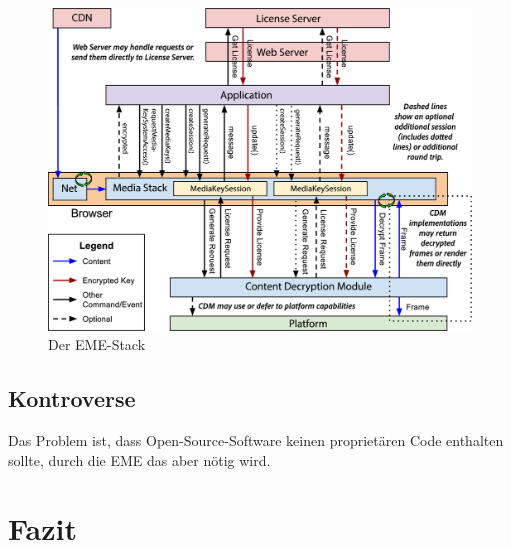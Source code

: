 \documentclass[a4paper,11pt]{scrartcl}
\begin{document}
\begin{figure}
    \includegraphics[width=1.0\textwidth]{eme-overview.png}
    \caption{Der EME-Stack\protect\footnotemark}
    \label{fig:EME}
\end{figure}

\subsection{Kontroverse}

Das Problem ist, dass Open-Source-Software keinen proprietären Code enthalten sollte, durch die EME das aber nötig wird.

\section{Fazit}




\end{document}
